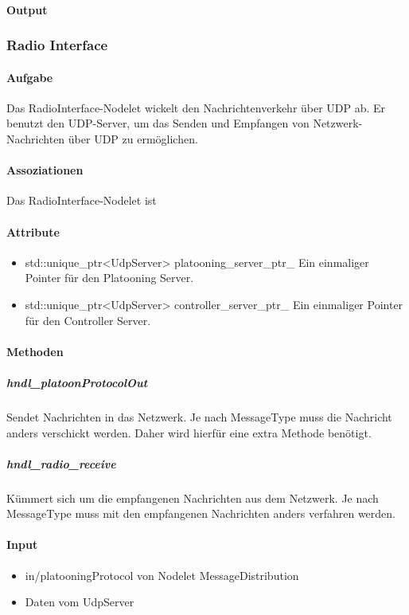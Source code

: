 \documentclass[a4paper, 12pt, titlepage]{scrartcl}
\begin{document}
				\paragraph{Output}

			\subsubsection{Radio Interface}
			\label{radio_interface}
				\paragraph{Aufgabe} Das RadioInterface-Nodelet wickelt den Nachrichtenverkehr über UDP ab. Er benutzt den UDP-Server, um das Senden und Empfangen von Netzwerk-Nachrichten über UDP zu ermöglichen.
				\paragraph{Assoziationen} Das RadioInterface-Nodelet ist
				\paragraph{Attribute}
					\begin{itemize}
					    \item std::unique\_ptr<UdpServer> platooning\_server\_ptr\_ Ein einmaliger Pointer für den Platooning Server.
					    \item std::unique\_ptr<UdpServer> controller\_server\_ptr\_ Ein einmaliger Pointer für den Controller Server.
					\end{itemize}
				\paragraph{Methoden}
				    \subparagraph{hndl\_platoonProtocolOut} Sendet Nachrichten in das Netzwerk. Je nach MessageType muss die Nachricht anders verschickt werden. Daher wird hierfür eine extra Methode benötigt.
					\subparagraph{hndl\_radio\_receive} Kümmert sich um die empfangenen Nachrichten aus dem Netzwerk. Je nach MessageType muss mit den empfangenen Nachrichten anders verfahren werden.
				\paragraph{Input}
				    \begin{itemize}
				        \item in/platooningProtocol von Nodelet MessageDistribution
				        \item Daten vom UdpServer
				    \end{itemize}
\end{document}
